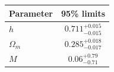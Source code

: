 \begin{tabular} { l  c}

 Parameter &  95\% limits\\
\hline
{\boldmath$h              $} & $0.711^{+0.015}_{-0.015}   $\\

{\boldmath$Ω_m            $} & $0.285^{+0.018}_{-0.017}   $\\

{\boldmath$M              $} & $0.06^{+0.79}_{-0.71}      $\\
\hline
\end{tabular}